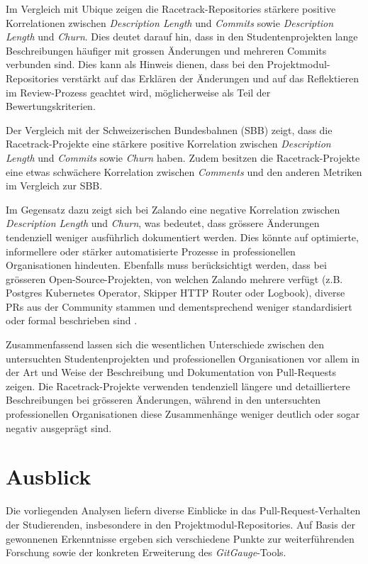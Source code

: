 Im Vergleich mit Ubique zeigen die Racetrack-Repositories stärkere positive Korrelationen zwischen \textit{Description Length} und \textit{Commits} sowie \textit{Description Length} und \textit{Churn}. Dies deutet darauf hin, dass in den Studentenprojekten lange Beschreibungen häufiger mit grossen Änderungen und mehreren Commits verbunden sind. Dies kann als Hinweis dienen, dass bei den Projektmodul-Repositories verstärkt auf das Erklären der Änderungen und auf das Reflektieren im Review-Prozess geachtet wird, möglicherweise als Teil der Bewertungskriterien. 

Der Vergleich mit der Schweizerischen Bundesbahnen (SBB) zeigt, dass die Race\-track-Projekte eine stärkere positive Korrelation zwischen \textit{Description Length} und \textit{Commits} sowie \textit{Churn} haben. Zudem besitzen die Racetrack-Projekte eine etwas schwächere Korrelation zwischen \textit{Comments} und den anderen Metriken im Vergleich zur SBB.

Im Gegensatz dazu zeigt sich bei Zalando eine negative Korrelation zwischen \textit{Description Length} und \textit{Churn}, was bedeutet, dass grössere Änderungen tendenziell weniger ausführlich dokumentiert werden. Dies könnte auf optimierte, informellere oder stärker automatisierte Prozesse in professionellen Organisationen hindeuten. Ebenfalls muss berücksichtigt werden, dass bei grösseren Open-Source-Projekten, von welchen Zalando mehrere verfügt (z.B. Postgres Kubernetes Operator, Skipper HTTP Router oder Logbook), diverse PRs aus der Community stammen und dementsprechend weniger standardisiert oder formal beschrieben sind \parencite{noauthor_zalandologbook_2025} \parencite{noauthor_zalandoskipper_2025} \parencite{noauthor_zalandopostgres-operator_2025}.

Zusammenfassend lassen sich die wesentlichen Unterschiede zwischen den untersuchten Studentenprojekten und professionellen Organisationen vor allem in der Art und Weise der Beschreibung und Dokumentation von Pull-Requests zeigen. Die Racetrack-Projekte verwenden tendenziell längere und detailliertere Beschreibungen bei grösseren Änderungen, während in den untersuchten professionellen Organisationen diese Zusammenhänge weniger deutlich oder sogar negativ ausgeprägt sind.


\pagebreak
\section{Ausblick}
Die vorliegenden Analysen liefern diverse Einblicke in das Pull-Request-Verhalten der Studierenden, insbesondere in den Projektmodul-Repositories. 
Auf Basis der gewonnenen Erkenntnisse ergeben sich verschiedene Punkte zur weiterführenden Forschung sowie der konkreten Erweiterung des \textit{GitGauge}-Tools. 

